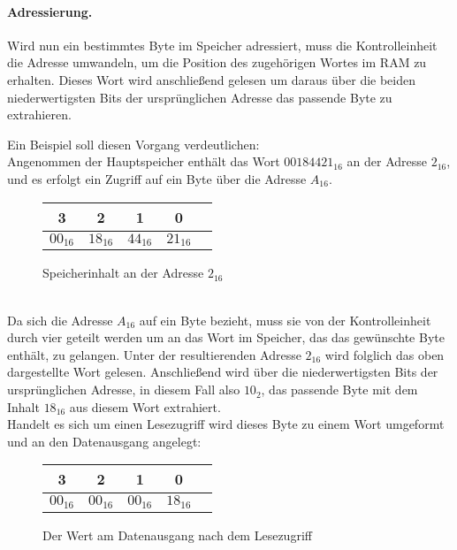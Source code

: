 \paragraph{Adressierung.} Wird nun ein bestimmtes Byte im Speicher adressiert, muss die Kontrolleinheit die Adresse umwandeln, um die Position des zugehörigen Wortes im RAM zu erhalten. 
Dieses Wort wird anschließend gelesen um daraus über die beiden niederwertigsten Bits der ursprünglichen Adresse das passende Byte zu extrahieren.

Ein Beispiel soll diesen Vorgang verdeutlichen:\\
Angenommen der Hauptspeicher enthält das Wort $00184421_{16}$ an der Adresse $2_{16}$,
und es erfolgt ein Zugriff auf ein Byte über die Adresse $A_{16}$.
\begin{figure} [htpb]
    \centering
        \begin{tabular}{|c|c|c|c|c|}
            \multicolumn{1}{c}{3} & \multicolumn{1}{c}{2} &  \multicolumn{1}{c}{1}& \multicolumn{1}{c}{0}\\
            \hline
            $00_{16}$ & $18_{16}$ & $44_{16}$ & $21_{16}$\\
            \hline
        \end{tabular}
        \caption{Speicherinhalt an der Adresse $2_{16}$}
\end{figure}
\\                                                        
Da sich die Adresse $A_{16}$ auf ein Byte bezieht, muss sie von der Kontrolleinheit durch vier geteilt werden um an das Wort im Speicher, das das gewünschte Byte enthält, zu gelangen.
Unter der resultierenden Adresse $2_{16}$ wird folglich das oben dargestellte Wort gelesen.
Anschließend wird über die niederwertigsten Bits der ursprünglichen Adresse, in diesem Fall also $10_2$, das passende Byte mit dem Inhalt $18_{16}$ aus diesem Wort extrahiert.\\
Handelt es sich um einen Lesezugriff wird dieses Byte zu einem Wort umgeformt und an den Datenausgang angelegt:\\
\begin{figure} [htpb]
    \centering
        \begin{tabular}{|c|c|c|c|c|}
            \multicolumn{1}{c}{3} & \multicolumn{1}{c}{2} &  \multicolumn{1}{c}{1}& \multicolumn{1}{c}{0}\\
            \hline
            $00_{16}$ & $00_{16}$ & $00_{16}$ & $18_{16}$\\
            \hline
        \end{tabular}
        \caption{Der Wert am Datenausgang nach dem Lesezugriff}
\end{figure}\\
